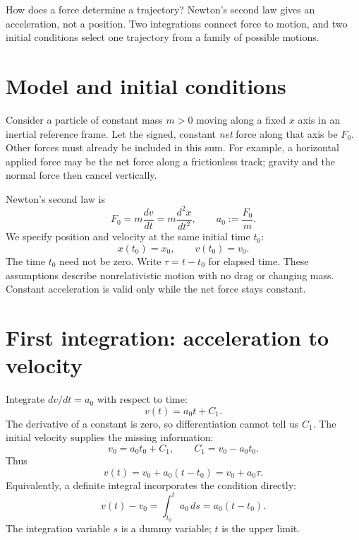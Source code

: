How does a force determine a trajectory? Newton's second law gives an
acceleration, not a position. Two integrations connect force to motion, and
two initial conditions select one trajectory from a family of possible motions.

\section{Model and initial conditions}
Consider a particle of constant mass $m>0$ moving along a fixed $x$ axis in an
inertial reference frame. Let the signed, constant \emph{net} force along that
axis be $F_0$. Other forces must already be included in this sum. For example,
a horizontal applied force may be the net force along a frictionless track;
gravity and the normal force then cancel vertically.

Newton's second law is
\begin{equation}
 F_0 = m\frac{dv}{dt} = m\frac{d^2x}{dt^2},
 \qquad a_0 := \frac{F_0}{m}.
\end{equation}
We specify position and velocity at the same initial time $t_0$:
\begin{equation}
 x(t_0)=x_0, \qquad v(t_0)=v_0.
\end{equation}
The time $t_0$ need not be zero. Write $\tau=t-t_0$ for elapsed time.
These assumptions describe nonrelativistic motion with no drag or changing
mass. Constant acceleration is valid only while the net force stays constant.

\section{First integration: acceleration to velocity}
Integrate $dv/dt=a_0$ with respect to time:
\begin{equation}
 v(t)=a_0t+C_1.
\end{equation}
The derivative of a constant is zero, so differentiation cannot tell us $C_1$.
The initial velocity supplies the missing information:
\begin{equation}
 v_0=a_0t_0+C_1,
 \qquad C_1=v_0-a_0t_0.
\end{equation}
Thus
\begin{equation}
 \boxed{v(t)=v_0+a_0(t-t_0)=v_0+a_0\tau.}
\end{equation}
Equivalently, a definite integral incorporates the condition directly:
\begin{equation}
 v(t)-v_0=\int_{t_0}^{t}a_0\,ds=a_0(t-t_0).
\end{equation}
The integration variable $s$ is a dummy variable; $t$ is the upper limit.

